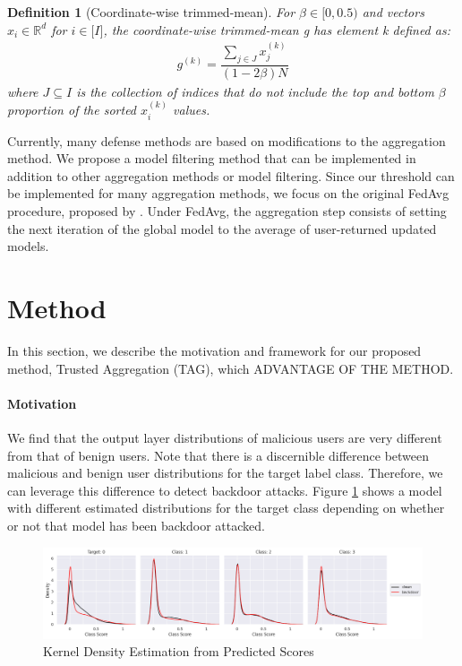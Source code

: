 \documentclass{article} %
\newtheorem{definition}{Definition}
\begin{document}
\begin{definition}[Coordinate-wise trimmed-mean]
For $\beta \in \mathopen[ 0, 0.5 \mathclose)$ and vectors $x_i \in \mathbb{R}^{d}$ for $i \in \mathopen[I\mathclose]$, the coordinate-wise trimmed-mean g has element k defined as:
\begin{align*}
g^{(k)} = \dfrac{\sum_{j \in J}{x_j^{(k)}}}{(1 - 2\beta)N}
\end{align*}
where $J \subseteq I$ is the collection of indices that do not include the top and bottom $\beta$ proportion of the sorted $x_i^{(k)}$ values.
\end{definition}

Currently, many defense methods are based on modifications to the aggregation method. We propose a model filtering method that can be implemented in addition to other aggregation methods or model filtering. Since our threshold can be implemented for many aggregation methods, we focus on the original FedAvg procedure, proposed by \cite{fedavg}. Under FedAvg, the aggregation step consists of setting the next iteration of the global model to the average of user-returned updated models. 


%
\section{Method}

In this section, we describe the motivation and framework for our proposed method, Trusted Aggregation (TAG), which ADVANTAGE OF THE METHOD. 

\paragraph{Motivation}

We find that the output layer distributions of malicious users are very different from that of benign users. Note that there is a discernible difference between malicious and benign user distributions for the target label class. Therefore, we can leverage this difference to detect backdoor attacks. Figure \ref{fig:motivation} shows a model with different estimated distributions for the target class depending on whether or not that model has been backdoor attacked. 

\begin{figure}[H]
    \centering
    \includegraphics[width=\textwidth]{make_article/make_visuals/visuals/ext_motivation.png}
    \caption{Kernel Density Estimation from Predicted Scores}
    \label{fig:motivation}
\end{figure}
\end{document}
